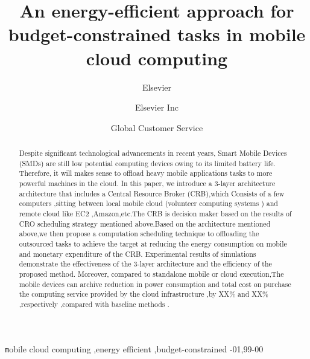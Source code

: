 \documentclass[review]{elsarticle}
\begin{document}
\begin{frontmatter}

\title{An energy-efficient approach for budget-constrained tasks in mobile cloud computing}

\author{Elsevier}
\address{Radarweg 29, Amsterdam}

\author[mymainaddress,mysecondaryaddress]{Elsevier Inc}

\author[mysecondaryaddress]{Global Customer Service}

\address[mymainaddress]{1600 John F Kennedy Boulevard, Philadelphia}
\address[mysecondaryaddress]{360 Park Avenue South, New York}

\begin{abstract}
    Despite significant technological advancements in recent years, Smart Mobile Devices (SMDs) are still low potential computing devices owing to its limited battery life. Therefore, it will makes sense to offload heavy mobile applications tasks to more powerful machines in the cloud.
    In this paper, we introduce a 3-layer architecture architecture that includes a Central Resource Broker (CRB),which Consists of a few computers ,sitting between local mobile cloud (volunteer computing systems ) and remote cloud like EC2 ,Amazon,etc.The CRB is decision maker based on the results of CRO scheduling strategy mentioned above.Based on the architecture mentioned above,we then propose a computation scheduling technique to offloading the outsourced tasks to achieve the target at reducing the energy consumption on mobile and monetary expenditure of the CRB.
    Experimental results of simulations demonstrate the effectiveness of the 3-layer architecture and the efficiency of the proposed method. Moreover, compared to standalone mobile or cloud execution,The mobile devices can archive reduction in power consumption and total cost on purchase the computing service provided by the cloud infrastructure ,by XX\% and XX\% ,respectively ,compared with baseline methods .
\end{abstract}

\begin{keyword}
    \texttt mobile cloud computing \sep  {energy efficient} \sep {budget-constrained}
    -01\sep  99-00
\end{keyword}

\end{frontmatter}
\end{document}
